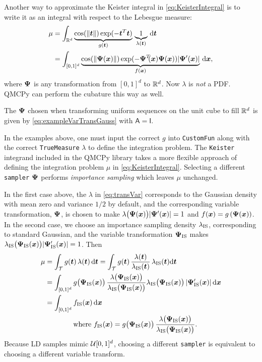 \documentclass[graybox,footinfo]{svmult}
\newcommand{\QMCPYabs}[1]{\ensuremath{{\left \lvert #1 \right \rvert}}}
\newcommand{\IMP}{\textup{IS}}
\newcommand{\mA}{\mathsf{A}}
\newcommand{\mI}{\mathsf{I}}
\newcommand{\cube}{[0,1]^d}
\begin{document}
Another way to approximate the Keister integral in \eqref{eq:KeisterIntegral} is to write it as an integral with respect to the Lebesgue measure:
\begin{align*} 
	\mu 
	& = \int_{\bbR^d} \underbrace{\cos(\lVert \bst \rVert) \exp(-\bst^T \bst) }_{g(\bst)} \, \underbrace{1}_{\lambda(\bst)} \,\D \bst \\
	& = \int_{[0,1]^d} \underbrace{\cos(\lVert \bsPsi(\bsx) \rVert) \exp(-\bsPsi^T\!\!(\bsx) \bsPsi(\bsx)) \QMCPYabs{\bsPsi'(\bsx)}  }_{f(\bsx)} \, \D \bsx,
\end{align*}
where ${\boldsymbol{\Psi}}$ is any transformation from $[0,1]^d$ to ${\mathbb{R}}^d$. Now $\lambda$ is \emph{not} a PDF.  QMCPy can perform the cubature this way as well.

The ${\boldsymbol{\Psi}}$ chosen when transforming uniform sequences on the unit cube to fill ${\mathbb{R}}^d$ is  given by \eqref{eq:exampleVarTransGauss} with $\mA = \mI$.

In the examples above, one must input the correct $g$ into \texttt{CustomFun} along with the correct \texttt{TrueMeasure} $\lambda$ to define the integration problem. The \texttt{Keister} integrand included in the QMCPy library takes a more flexible approach of defining the integration problem $\mu$ in \eqref{eq:KeisterIntegral}. Selecting a different \texttt{sampler} ${\boldsymbol{\Psi}}$ performs  \emph{importance sampling} which leaves $\mu$ unchanged.  


In the first case above, the $\lambda$ in \eqref{eq:transVar} corresponds to the Gaussian density  with mean zero and variance $1/2$ by default, and the corresponding variable transformation, ${\boldsymbol{\Psi}}$, is chosen to make $\lambda\bigl(\bsPsi(\bsx)\bigr) \QMCPYabs{\bsPsi'(\bsx)}  = 1$ and $f({\boldsymbol{x}}) = g\left({\boldsymbol{\Psi}}({\boldsymbol{x}}) \right)$.  In the second case,  we choose an importance sampling density $\lambda_{\IMP}$, corresponding  to standard  Gaussian, and the variable transformation $\bsPsi_{\IMP}$ makes $\lambda_\IMP\bigl(\bsPsi_{\IMP}(\bsx)\bigr) \QMCPYabs{\bsPsi'_{\IMP}(\bsx)}  = 1$.  Then
\begin{align}
	\nonumber 
	\mu &= \int_\calT g(\bst) \, \lambda(\bst) \, \D \bst  = \int_\calT g(\bst) \, \frac{\lambda(\bst)}{\lambda_\IMP(\bst) } \, \lambda_\IMP(\bst) \D \bst  \\ 
	\nonumber
	& =  \int_{\cube} g\bigl(\bsPsi_\IMP(\bsx)\bigr) \, \frac{\lambda\bigl(\bsPsi_\IMP(\bsx)\bigr)} {\lambda_\IMP\bigl(\bsPsi_\IMP(\bsx)\bigr) } \lambda_\IMP\bigl(\bsPsi_\IMP(\bsx)\bigr) \,\QMCPYabs{\bsPsi'_{\IMP}(\bsx)}  \, \D \bsx \\
	\nonumber
	& =  \int_{\cube} f_\IMP(\bsx) \, \D \bsx  \\
	\label{eq:transVarImp}
	& \qquad \qquad \text{where } f_\IMP(\bsx)  = g\bigl(\bsPsi_\IMP(\bsx)\bigr)  \,  \frac{\lambda\bigl(\bsPsi_\IMP(\bsx)\bigr)} {\lambda_\IMP\bigl(\bsPsi_\IMP(\bsx)\bigr) }.
\end{align}
Because LD samples mimic $\calU\cube$, choosing a different \texttt{sampler} is equivalent to choosing a different variable transform.
\end{document}
